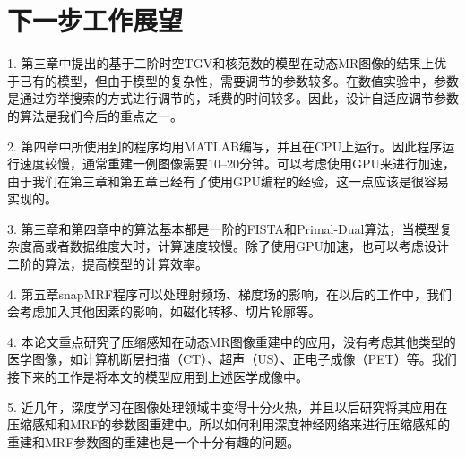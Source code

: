 \section{下一步工作展望}
1. 第三章中提出的基于二阶时空TGV和核范数的模型在动态MR图像的结果上优于已有的模型，但由于模型的复杂性，需要调节的参数较多。在数值实验中，参数是通过穷举搜索的方式进行调节的，耗费的时间较多。因此，设计自适应调节参数的算法是我们今后的重点之一。

2. 第四章中所使用到的程序均用MATLAB编写，并且在CPU上运行。因此程序运行速度较慢，通常重建一例图像需要10--20分钟。可以考虑使用GPU来进行加速，由于我们在第三章和第五章已经有了使用GPU编程的经验，这一点应该是很容易实现的。

3. 第三章和第四章中的算法基本都是一阶的FISTA和Primal-Dual算法，当模型复杂度高或者数据维度大时，计算速度较慢。除了使用GPU加速，也可以考虑设计二阶的算法，提高模型的计算效率。

4. 第五章snapMRF程序可以处理射频场、梯度场的影响，在以后的工作中，我们会考虑加入其他因素的影响，如磁化转移、切片轮廓等。

4. 本论文重点研究了压缩感知在动态MR图像重建中的应用，没有考虑其他类型的医学图像，如计算机断层扫描（CT）、超声（US）、正电子成像（PET）等。我们接下来的工作是将本文的模型应用到上述医学成像中。

5. 近几年，深度学习在图像处理领域中变得十分火热，并且以后研究将其应用在压缩感知和MRF的参数图重建中。所以如何利用深度神经网络来进行压缩感知的重建和MRF参数图的重建也是一个十分有趣的问题。
